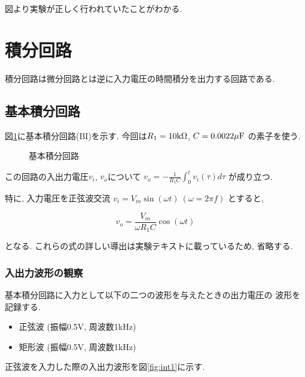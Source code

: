 \documentclass[titlepage]{jsarticle}
\begin{document}
            図より実験が正しく行われていたことがわかる.

\section{積分回路}
    積分回路は微分回路とは逆に入力電圧の時間積分を出力する回路である.

    \subsection{基本積分回路}
        図\ref{fig:int}に基本積分回路(BI)を示す.
        今回は$R_1 = 10\rm{k\Omega}$, $C = 0.0022\rm{\mu F}$
        の素子を使う.

        \begin{figure}[h]
            \centering
            \caption{基本積分回路}
            \label{fig:int}
        \end{figure}

        この回路の入出力電圧$v_i$, $v_o$について
        $\displaystyle v_o = -\frac{1}{R_1C}\int^t_0v_i(\tau)d\tau$
        が成り立つ.

        特に, 入力電圧を正弦波交流
        $v_i = V_m\sin(\omega t) \ (\omega = 2\pi f)$
        とすると,

        \begin{equation}
            v_o = \frac{V_m}{\omega R_1C}\cos(\omega t) \label{equ:int}
        \end{equation}

        となる.
        これらの式の詳しい導出は実験テキスト\cite{text}に載っているため,
        省略する.

        \subsubsection{入出力波形の観察}
            基本積分回路に入力として以下の二つの波形を与えたときの出力電圧の
            波形を記録する.

            \begin{itemize}
                \item 正弦波 (振幅0.5V, 周波数1kHz)
                \item 矩形波 (振幅0.5V, 周波数1kHz)
            \end{itemize}

            正弦波を入力した際の入出力波形を図\ref{fig:int1}に示す.
\end{document}
